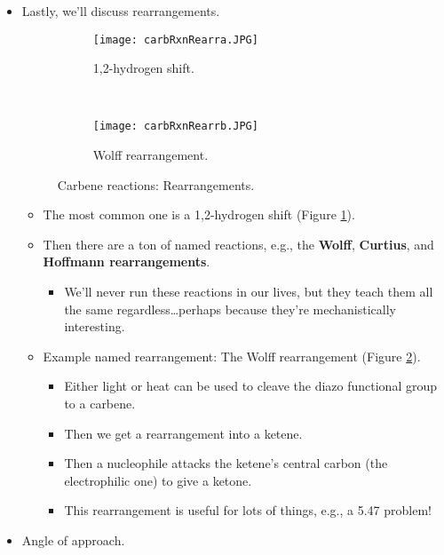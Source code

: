 \documentclass[../notes.tex]{subfiles}
\begin{document}
\begin{itemize}
    \item Lastly, we'll discuss rearrangements.
    \begin{figure}[H]
        \centering
        \begin{subfigure}[b]{\linewidth}
            \centering
            \texttt{[image: carbRxnRearra.JPG]}
            \caption{1,2-hydrogen shift.}
            \label{fig:carbRxnRearra}
        \end{subfigure}\\[2em]
        \begin{subfigure}[b]{\linewidth}
            \centering
            \texttt{[image: carbRxnRearrb.JPG]}
            \caption{Wolff rearrangement.}
            \label{fig:carbRxnRearrb}
        \end{subfigure}
        \caption{Carbene reactions: Rearrangements.}
        \label{fig:carbRxnRearr}
    \end{figure}
    \begin{itemize}
        \item The most common one is a 1,2-hydrogen shift (Figure \ref{fig:carbRxnRearra}).
        \item Then there are a ton of named reactions, e.g., the \textbf{Wolff}, \textbf{Curtius}, and \textbf{Hoffmann rearrangements}.
        \begin{itemize}
            \item We'll never run these reactions in our lives, but they teach them all the same regardless\dots perhaps because they're mechanistically interesting.
        \end{itemize}
        \item Example named rearrangement: The Wolff rearrangement (Figure \ref{fig:carbRxnRearrb}).
        \begin{itemize}
            \item Either light or heat can be used to cleave the diazo functional group to a carbene.
            \item Then we get a rearrangement into a ketene.
            \item Then a nucleophile attacks the ketene's central carbon (the electrophilic one) to give a ketone.
            \item This rearrangement is useful for lots of things, e.g., a 5.47 problem!
        \end{itemize}
    \end{itemize}
    \item Angle of approach.

\end{itemize}
\end{document}
